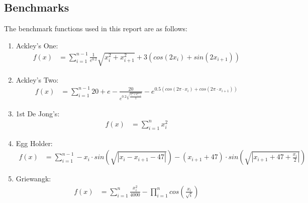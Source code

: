 \documentclass{article}
\begin{document}
        \subsection{Benchmarks}
The benchmark functions used in this report are as follows:
\begin{enumerate}
\item Ackley's One:
    \begin{equation} \label{eq:ackley_one} \tag{Ackley's One}
    \begin{aligned}
        f(x) &= \sum_{i=1}^{n-1}\frac{1}{e^{0.2}}\sqrt{x_i^2+x_{i+1}^2}+3\left(cos\left(2x_i\right)+sin\left(2x_{i+1}\right)\right)
    \end{aligned}
    \end{equation}

\item Ackley's Two:
    \begin{equation} \label{eq:ackley_two} \tag{Ackley's Two}
    \begin{aligned}
        f(x) &= \sum_{i=1}^{n-1}20+e-\frac{20}{e^{0.2\sqrt{\frac{x_i^2+x_{i+1}^2}{2}}}}-e^{0.5\left(cos\left(2\pi\cdot x_i\right) + cos\left(2\pi\cdot x_{i+1}\right)\right)}
    \end{aligned}
    \end{equation}

\item 1st De Jong's:
    \begin{equation} \label{eq:de_jong} \tag{1st De Jong's}
    \begin{aligned}
        f(x) &= \sum_{i=1}^{n}x_i^2
    \end{aligned}
    \end{equation}

\item Egg Holder:
    \begin{equation} \label{eq:egg} \tag{Egg Holder}
    \begin{aligned}
        f(x) &= \sum_{i=1}^{n-1}-x_i\cdot sin\left(\sqrt{\left|x_i-x_{i+1}-47\right|}\right) - \left(x_{i+1}+47\right)\cdot sin\left(\sqrt{\left|x_{i+1}+47+\frac{x_i}{2}\right|}\right)
    \end{aligned}
    \end{equation}

\item Griewangk:
    \begin{equation} \label{eq:griewangk} \tag{Griewangk}
    \begin{aligned}
        f(x) &= \sum_{i=1}^{n}\frac{x_i^2}{4000}-\prod_{i=1}^{n}cos\left(\frac{x_i}{\sqrt{i}}\right)
    \end{aligned}
    \end{equation}


\end{enumerate}
\end{document}
